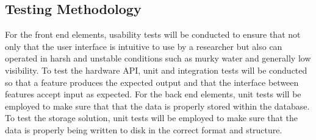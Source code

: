  \subsection{Testing Methodology}
 For the front end elements, usability tests will be conducted to ensure that not only that the user interface is intuitive to use by a researcher but also can operated in harsh and unstable conditions such as murky water and generally low visibility. To test the hardware API, unit and integration tests will be conducted so that a feature produces the expected output and that the interface between features accept input as expected. For the back end elements, unit tests will be employed to make sure that that the data is properly stored within the database. To test the storage solution, unit tests will be employed to make sure that the data is properly being written to disk in the correct format and structure.